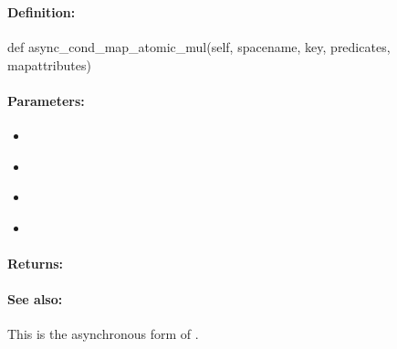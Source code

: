 \pagebreak
\subsubsection{}
\label{api:python:async_cond_map_atomic_mul}


\paragraph{Definition:}
\begin{pythoncode}
def async_cond_map_atomic_mul(self, spacename, key, predicates, mapattributes)
\end{pythoncode}

\paragraph{Parameters:}
\begin{itemize}[noitemsep]
\item {}\\

\item {}\\

\item {}\\

\item {}\\

\end{itemize}

\paragraph{Returns:}


\paragraph{See also:}  This is the asynchronous form of .

\pagebreak
\subsubsection{}
\label{api:python:map_atomic_div}


